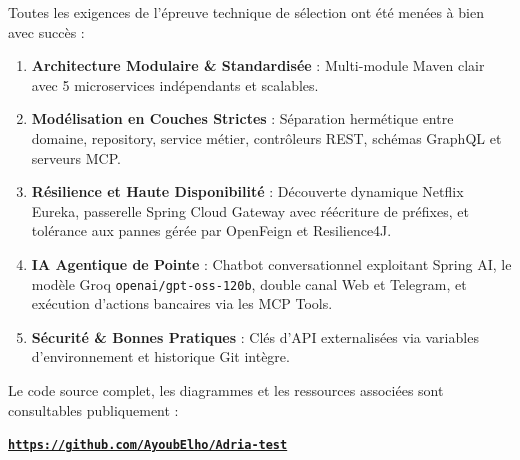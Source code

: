 \documentclass[11pt,a4paper]{report}
\begin{document}
Toutes les exigences de l'épreuve technique de sélection ont été menées à bien avec succès :
\begin{enumerate}
    \item \textbf{Architecture Modulaire \& Standardisée} : Multi-module Maven clair avec 5 microservices indépendants et scalables.
    \item \textbf{Modélisation en Couches Strictes} : Séparation hermétique entre domaine, repository, service métier, contrôleurs REST, schémas GraphQL et serveurs MCP.
    \item \textbf{Résilience et Haute Disponibilité} : Découverte dynamique Netflix Eureka, passerelle Spring Cloud Gateway avec réécriture de préfixes, et tolérance aux pannes gérée par OpenFeign et Resilience4J.
    \item \textbf{IA Agentique de Pointe} : Chatbot conversationnel exploitant Spring AI, le modèle Groq \texttt{openai/gpt-oss-120b}, double canal Web et Telegram, et exécution d'actions bancaires via les MCP Tools.
    \item \textbf{Sécurité \& Bonnes Pratiques} : Clés d'API externalisées via variables d'environnement et historique Git intègre.
\end{enumerate}

Le code source complet, les diagrammes et les ressources associées sont consultables publiquement :\\
\begin{center}
\href{https://github.com/AyoubElho/Adria-test}{\Large\textbf{\color{secondary}\texttt{https://github.com/AyoubElho/Adria-test}}}
\end{center}
\end{document}
